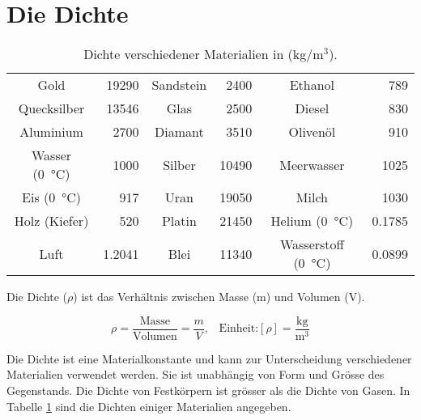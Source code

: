 \section{Die Dichte}

\begin{table}
	\centering
	\begin{tabular}{c r | c r | c r}
		Gold                             & 19290  & 	Sandstein     & 2400 & Ethanol  & 789\\
		Quecksilber                      & 13546  & 	Glas          &2500  & Diesel   & 830\\
		Aluminium                        &  2700  & 	Diamant       & 3510 & Olivenöl & 910\\
		Wasser (\SI{0}{\degreeCelsius})  &  1000  & 	Silber        & 10490& Meerwasser& 1025 \\
        Eis (\SI{0}{\degreeCelsius})     &   917  & 	Uran          & 19050& Milch    & 1030\\
		Holz (Kiefer)                    &   520  & 	Platin        & 21450& Helium (\SI{0}{\degreeCelsius})   & \num{0,1785}\\
		Luft                             &  1.2041& 	Blei          & 11340& Wasserstoff (\SI{0}{\degreeCelsius}) & \num{0,0899}\\
	\end{tabular}
	\caption{Dichte verschiedener Materialien in (\si{kg}/\si{m}$^3$).}
	\label{tab:dichte}
\end{table}


Die Dichte ($\rho$) ist das Verhältnis zwischen Masse (m) und Volumen (V).


\begin{cbox}
\begin{equation*}
	\rho = \frac{\text{Masse}}{\text{Volumen}} = \frac{m}{V}\text{,}\quad\text{Einheit:} [\rho]=\frac{\text{kg}}{\text{m}^3} 
\end{equation*}
\end{cbox}

Die Dichte ist eine Materialkonstante und kann zur Unterscheidung verschiedener Materialien
verwendet werden. Sie ist unabhängig von Form und Grösse des Gegenstands. 
Die Dichte von Festkörpern ist grösser als die Dichte von Gasen.
In Tabelle \ref{tab:dichte} sind die Dichten einiger Materialien angegeben.

